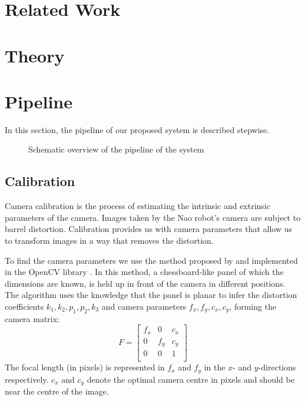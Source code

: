 \documentclass[a4paper]{article}
\begin{document}
\section{Related Work}

\section{Theory}

\section{Pipeline}
In this section, the pipeline of our proposed system is described stepwise.

\begin{figure}[!hb]
	\centerline{
	}
	\caption{Schematic overview of the pipeline of the system}
	\label{fig:system}
\end{figure}

\subsection{Calibration}
Camera calibration is the process of estimating the intrinsic and extrinsic
parameters of the camera. Images taken by the Nao robot's camera are subject to
barrel distortion. Calibration provides us with camera parameters that allow us
to transform images in a way that removes the distortion.
\par
To find the camera parameters we use the method proposed by
\cite{zhang1999flexible} and implemented in the OpenCV library
\citep{opencv_library}. In this method, a chessboard-like panel of which the
dimensions are known, is held up in front of the camera in different positions.
The algorithm uses the knowledge that the panel is planar to infer the
distortion coefficients $k_1, k_2, p_1, p_2, k_3$ and camera parameters $f_x,
f_y, c_x, c_y$, forming the camera matrix:
$$
F =
\begin{bmatrix}
	f_x	& 0		& c_x\\
	0		& f_y		& c_y\\
	0		& 0		& 1\\
\end{bmatrix}
$$
The focal length (in pixels) is represented in $f_x$ and $f_y$ in the $x$- and
$y$-directions respectively. $c_x$ and $c_y$ denote the optimal camera centre
in pixels and should be near the centre of the image.
\end{document}
